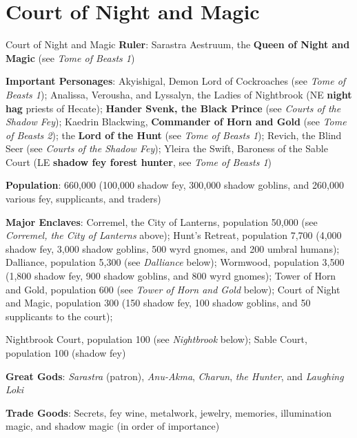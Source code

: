 \documentclass[10pt,a4paper,twoside,bg=print,twocolumn,openany,nodeprecatedcode]{dndbook}
\begin{document}
\section{Court of Night and Magic}
\begin{DndSidebar}[float=!b]{Court of Night and Magic}
\textbf{Ruler}: Sarastra Aestruum, the \textbf{Queen of Night and Magic} (see \textit{Tome of Beasts 1})



\textbf{Important Personages}: Akyishigal, Demon Lord of Cockroaches (see \textit{Tome of Beasts 1}); Analissa, Verousha, and Lyssalyn, the Ladies of Nightbrook (NE \textbf{night hag} priests of Hecate); \textbf{Hander Svenk, the Black Prince} (see \textit{Courts of the Shadow Fey}); Kaedrin Blackwing, \textbf{Commander of Horn and Gold} (see \textit{Tome of Beasts 2}); the \textbf{Lord of the Hunt} (see \textit{Tome of Beasts 1}); Revich, the Blind Seer (see \textit{Courts of the Shadow Fey}); Yleira the Swift, Baroness of the Sable Court (LE \textbf{shadow fey forest hunter}, see \textit{Tome of Beasts 1})



\textbf{Population}: 660,000 (100,000 shadow fey, 300,000 shadow goblins, and 260,000 various fey, supplicants, and traders)



\textbf{Major Enclaves}: Corremel, the City of Lanterns, population 50,000 (see \textit{Corremel, the City of Lanterns} above); Hunt's Retreat, population 7,700 (4,000 shadow fey, 3,000 shadow goblins, 500 wyrd gnomes, and 200 umbral humans); Dalliance, population 5,300 (see \textit{Dalliance} below); Wormwood, population 3,500 (1,800 shadow fey, 900 shadow goblins, and 800 wyrd gnomes); Tower of Horn and Gold, population 600 (see \textit{Tower of Horn and Gold} below); Court of Night and Magic, population 300 (150 shadow fey, 100 shadow goblins, and 50 supplicants to the court);



Nightbrook Court, population 100 (see \textit{Nightbrook} below); Sable Court, population 100 (shadow fey)



\textbf{Great Gods}: \textit{Sarastra} (patron), \textit{Anu-Akma}, \textit{Charun}, \textit{the Hunter}, and \textit{Laughing Loki}



\textbf{Trade Goods}: Secrets, fey wine, metalwork, jewelry, memories, illumination magic, and shadow magic (in order of importance)





\end{DndSidebar}
\end{document}
